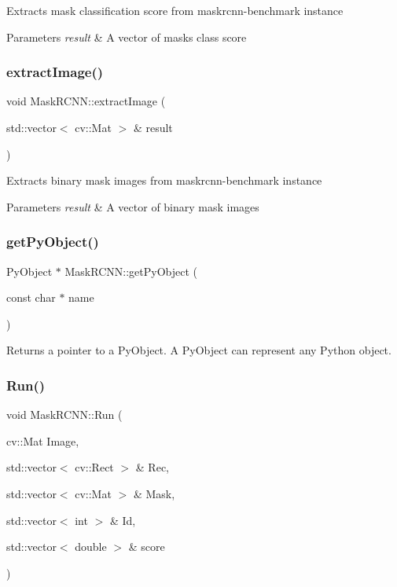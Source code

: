 Extracts mask classification score from maskrcnn-\/benchmark instance 
\begin{DoxyParams}{Parameters}
{\em result} & A vector of masks class score \\
\hline
\end{DoxyParams}
\mbox{\label{classMaskRCNN_a3645133094358fbe319b4ae6015d662a}} 
\subsubsection{\texorpdfstring{extract\+Image()}{extractImage()}}
{\footnotesize\ttfamily void Mask\+R\+C\+N\+N\+::extract\+Image (\begin{DoxyParamCaption}\item[{std\+::vector$<$ cv\+::\+Mat $>$ \&}]{result }\end{DoxyParamCaption})}

Extracts binary mask images from maskrcnn-\/benchmark instance 
\begin{DoxyParams}{Parameters}
{\em result} & A vector of binary mask images \\
\hline
\end{DoxyParams}
\mbox{\label{classMaskRCNN_ac053158f922a85807ba5bba9822848c7}} 
\subsubsection{\texorpdfstring{get\+Py\+Object()}{getPyObject()}}
{\footnotesize\ttfamily Py\+Object $\ast$ Mask\+R\+C\+N\+N\+::get\+Py\+Object (\begin{DoxyParamCaption}\item[{const char $\ast$}]{name }\end{DoxyParamCaption})}

Returns a pointer to a Py\+Object. A Py\+Object can represent any Python object. \mbox{\label{classMaskRCNN_a5663b7c0e5e9fd148802735bd7c3f368}} 
\subsubsection{\texorpdfstring{Run()}{Run()}}
{\footnotesize\ttfamily void Mask\+R\+C\+N\+N\+::\+Run (\begin{DoxyParamCaption}\item[{cv\+::\+Mat}]{Image,  }\item[{std\+::vector$<$ cv\+::\+Rect $>$ \&}]{Rec,  }\item[{std\+::vector$<$ cv\+::\+Mat $>$ \&}]{Mask,  }\item[{std\+::vector$<$ int $>$ \&}]{Id,  }\item[{std\+::vector$<$ double $>$ \&}]{score }\end{DoxyParamCaption})}

